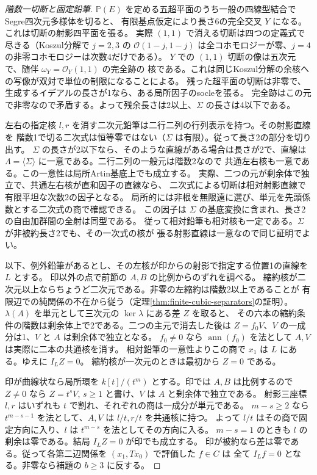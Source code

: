 \begin{proof}[階数一切断と固定鉛筆]
$\mathbb P(E)$ を定める五超平面のうち一般の四線型結合でSegre四次元多様体を切ると、
有限基点仮定により長さ6の完全交叉 $Y$ になる。これは切断の射影四平面を張る。
実際 $(1,1)$ で消える切断は四つの定義式で尽きる（Koszul分解で $j=2,3$ の
$\mathcal O(1-j,1-j)$ は全コホモロジーが零、$j=4$ の非零コホモロジーは次数4だけである）。
$Y$ での $(1,1)$ 切断の像は五次元で、随伴 $\omega_Y=\mathcal O_Y(1,1)$ の完全跡の
核である。これは同じKoszul分解の余核への写像が双対で単位の制限になることによる。
残った超平面の切断は非零で、生成するイデアルの長さが1なら、ある局所因子のsocleを張る。
完全跡はこの元で非零なので矛盾する。よって残余長さは2以上、$\Sigma$ の長さは4以下である。

左右の指定核 $l,r$ を消す二次元鉛筆は二行二列の行列表示を持つ。その射影直線を
階数1で切る二次式は恒等零ではない（$\Sigma$ は有限）。従って長さ2の部分を切り出す。
$\Sigma$ の長さが2以下なら、そのような直線がある場合は長さが2で、直線は
$\Lambda=\langle\Sigma\rangle$ に一意である。二行二列の一般元は階数2なので
共通左右核も一意である。この一意性は局所Artin基底上でも成立する。
実際、二つの元が剰余体で独立で、共通左右核が直和因子の直線なら、
二次式による切断は相対射影直線で有限平坦な次数2の因子となる。
局所的には非根を無限遠に選び、単元を先頭係数とする二次式の商で確認できる。
この因子は $\Sigma$ の基底変換に含まれ、長さ2の自由加群間の全射は同型である。
従って相対鉛筆も相対核も一定である。$\Sigma$ が非被約長さ2でも、その一次式の核が
張る射影直線は一意なので同じ証明でよい。

以下、例外鉛筆があるとし、その左核が印からの射影で指定する位置1の直線を $L$ とする。
印以外の点で前節の $A,B$ の比例からのずれを調べる。
縮約核が二次元以上ならちょうど二次元である。非零の左縮約は階数2以上であることが
有限辺での純関係の不在から従う（定理\ref{thm:finite-cubic-separators}の証明）。
$\lambda(A)$ を単元として三次元の $\ker\lambda$ にある差 $Z$ を取ると、
その六本の縮約条件の階数は剰余体上で2である。二つの主元で消去した後は
$Z=f_0 V$、$V$ の一成分は1、$V$ と $A$ は剰余体で独立となる。
$f_0\ne0$ なら $\operatorname{ann}(f_0)$ を法として $A,V$ は実際に二本の共通核を消す。
相対鉛筆の一意性よりこの商で $x_1$ は $L$ にある。ゆえに $I_L Z=0$。
縮約核が一次元のときは最初から $Z=0$ である。

印が曲線状なら局所環を $k[t]/(t^m)$ とする。印では $A,B$ は比例するので
$Z\ne0$ なら $Z=t^s V$, $s\ge1$ と書け、$V$ は $A$ と剰余体で独立である。
射影三座標 $l,r$ はいずれも $t$ で割れ、それぞれの商は一成分が単元である。
$m-s\ge2$ なら $t^{m-s-1}$ を法として、$A,V$ は $l/t,r/t$ を共通核に持つ。
よって $l/t$ はその商で固定方向に入り、$l$ は $t^{m-s}$ を法としてその方向に入る。
$m-s=1$ のときも $l$ の剰余は零である。結局 $I_L Z=0$ が印でも成立する。
印が被約なら差は零である。従って各第二辺関係を $(x_1,T x_0)$ で評価した $f\in C$ は
全て $I_L f=0$ となる。非零なら補題の $b\ge3$ に反する。


\end{proof}
